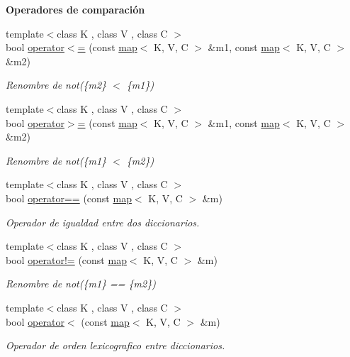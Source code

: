 \begin{Indent}{\bf \-Operadores de comparación}
\begin{DoxyCompactItemize}
{\footnotesize template$<$class K , class V , class C $>$ }\\bool \hyperlink{classaed2_1_1map_afe374b37f17263d0cad3ee19a590d208}{operator$<$=} (const \hyperlink{classaed2_1_1map}{map}$<$ \-K, \-V, \-C $>$ \&m1, const \hyperlink{classaed2_1_1map}{map}$<$ \-K, \-V, \-C $>$ \&m2)
\begin{DoxyCompactList}\small\item\em \-Renombre de not(\{m2\} $<$ \{m1\}) \end{DoxyCompactList}\item 
{\footnotesize template$<$class K , class V , class C $>$ }\\bool \hyperlink{classaed2_1_1map_a093a6d1a055339c5fc6297a1d47a9159}{operator$>$=} (const \hyperlink{classaed2_1_1map}{map}$<$ \-K, \-V, \-C $>$ \&m1, const \hyperlink{classaed2_1_1map}{map}$<$ \-K, \-V, \-C $>$ \&m2)
\begin{DoxyCompactList}\small\item\em \-Renombre de not(\{m1\} $<$ \{m2\}) \end{DoxyCompactList}\item 
{\footnotesize template$<$class K , class V , class C $>$ }\\bool \hyperlink{classaed2_1_1map_ab32f94f4767358534ab704c98d23ad89}{operator==} (const \hyperlink{classaed2_1_1map}{map}$<$ \-K, \-V, \-C $>$ \&m)
\begin{DoxyCompactList}\small\item\em \-Operador de igualdad entre dos diccionarios. \end{DoxyCompactList}\item 
{\footnotesize template$<$class K , class V , class C $>$ }\\bool \hyperlink{classaed2_1_1map_a11627296a0eb71c87e69caa89fbd94eb}{operator!=} (const \hyperlink{classaed2_1_1map}{map}$<$ \-K, \-V, \-C $>$ \&m)
\begin{DoxyCompactList}\small\item\em \-Renombre de not(\{m1\} == \{m2\}) \end{DoxyCompactList}\item 
{\footnotesize template$<$class K , class V , class C $>$ }\\bool \hyperlink{classaed2_1_1map_a4d766795e9a996ed79f8c08fbd1676cd}{operator$<$} (const \hyperlink{classaed2_1_1map}{map}$<$ \-K, \-V, \-C $>$ \&m)
\begin{DoxyCompactList}\small\item\em \-Operador de orden lexicografico entre diccionarios. \end{DoxyCompactList}\item 

\end{DoxyCompactItemize}
\end{Indent}
